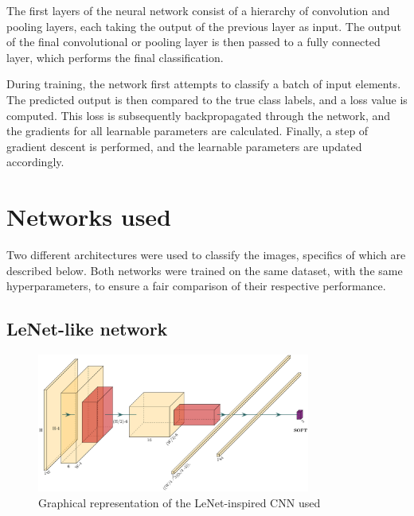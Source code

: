 \documentclass{pracalicmgr}
\begin{document}
The first layers of the neural network consist of a hierarchy of convolution and pooling layers, each taking the output of the previous layer as input. The output of the final convolutional or pooling layer is then passed to a fully connected layer, which performs the final classification.

During training, the network first attempts to classify a batch of input elements. The predicted output is then compared to the true class labels, and a loss value is computed. This loss is subsequently backpropagated through the network, and the gradients for all learnable parameters are calculated. Finally, a step of gradient descent is performed, and the learnable parameters are updated accordingly.


\section{Networks used}

Two different architectures were used to classify the images, specifics of which are described below. Both networks were trained on the same dataset, with the same hyperparameters, to ensure a fair comparison of their respective performance.

\subsection{LeNet-like network}

\begin{figure}[H]
    \centering
    \includegraphics[width=0.8\textwidth]{src/LeNetLike.pdf}
    \caption{Graphical representation of the LeNet-inspired CNN used}
    \label{fig:lenetLike_architecture}
\end{figure}
\end{document}
